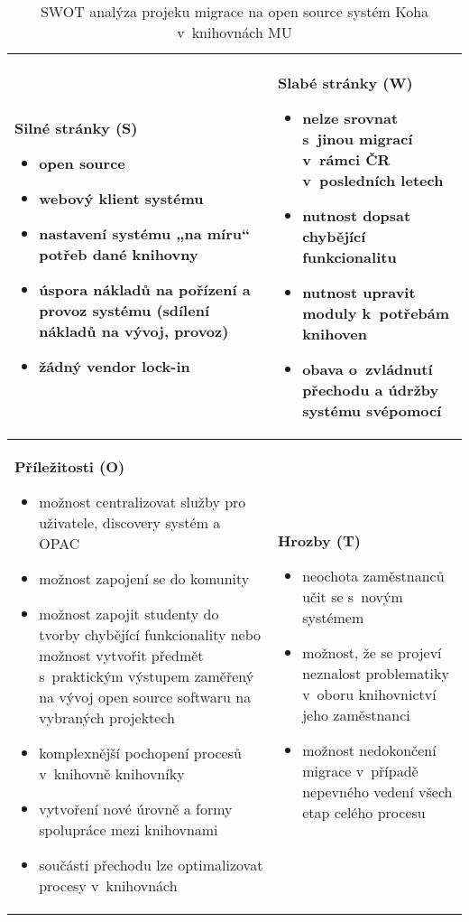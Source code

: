 \documentclass[
	11pt, oneside, printed, draft, 
	table,   %
	lof,     %
	lot     %
]{fithesis3}
\newcommand{\bold}[1]{\textbf{#1}}
\begin{document}
{\begin{table}
    \centering
    \begin{tabular}{ p{5.8cm} | p{5.8cm} }
    \bold{Silné stránky (S)} 
    \begin{itemize}
		\item open source
		\item webový klient systému
		\item nastavení systému „na míru“ potřeb dané knihovny
		\item úspora nákladů na pořízení a provoz systému (sdílení nákladů na vývoj, provoz)
		\item žádný vendor lock-in
	\end{itemize}
    & 
    \bold{Slabé stránky (W)} 
    \begin{itemize}
		\item nelze srovnat s~jinou migrací v~rámci ČR v~posledních letech
		\item nutnost dopsat chybějící funkcionalitu
		\item nutnost upravit moduly k~potřebám knihoven
		\item obava o~zvládnutí přechodu a údržby systému svépomocí
	\end{itemize}
    \\ \hline
    
    \bold{Příležitosti (O)} 
    \begin{itemize}
		\item možnost centralizovat služby pro uživatele, discovery systém a OPAC
		\item možnost zapojení se do komunity
		\item možnost zapojit studenty do tvorby chybějící funkcionality nebo možnost vytvořit předmět s~praktickým výstupem zaměřený na vývoj open source softwaru na vybraných projektech
		\item komplexnější pochopení procesů v~knihovně knihovníky
		\item vytvoření nové úrovně a formy spolupráce mezi knihovnami
		\item součásti přechodu lze optimalizovat procesy v~knihovnách
	\end{itemize}
    & 
    \bold{Hrozby (T)} 
    \begin{itemize}
		\item neochota zaměstnanců učit se s~novým systémem
		\item možnost, že se projeví neznalost problematiky v~oboru knihovnictví jeho zaměstnanci
		\item možnost nedokončení migrace v~případě nepevného vedení všech etap celého procesu
	\end{itemize}
    \end{tabular}
    \caption{SWOT analýza projeku migrace na open source systém Koha v~knihovnách MU}
\end{table}

}
\end{document}
